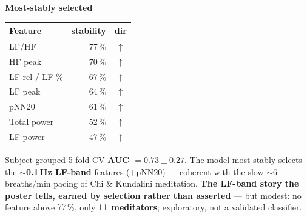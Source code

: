 \documentclass[fontsize=9pt]{scrartcl}
\renewcommand{\arraystretch}{1.35}
\newlength{\panelA}\setlength{\panelA}{97mm}
\begin{document}
\begin{minipage}[t][210mm][t]{\panelA}
\begin{tcolorbox}[panel,colback=jcindigodk,width=\panelA,height=210mm,fontupper=\color{white}]
  {\color{jclav}\bfseries\normalsize Most-stably selected\par}\vspace{2mm}
  {\color{white!92}\normalsize
   \renewcommand{\arraystretch}{1.3}\setlength{\tabcolsep}{4pt}%
   \begin{tabular}{@{}l r c@{}}
     \textbf{Feature} & \textbf{stability} & \textbf{dir}\\ \hline
     LF/HF & 77\,\% & $\uparrow$\\
     HF peak & 70\,\% & $\uparrow$\\
     LF rel / LF \% & 67\,\% & $\uparrow$\\
     LF peak & 64\,\% & $\uparrow$\\
     pNN20 & 61\,\% & $\uparrow$\\
     Total power & 52\,\% & $\uparrow$\\
     LF power & 47\,\% & $\uparrow$\\
   \end{tabular}\par}
  \vspace{4mm}
  {\raggedright\normalsize\color{white!90}
   Subject-grouped 5-fold CV \textbf{AUC $=0.73\pm0.27$}. The model most stably
   selects the \textbf{$\sim$0.1\,Hz LF-band} features ($+$pNN20) --- coherent with
   the slow $\sim$6\,breaths/min pacing of Chi \& Kundalini meditation. \textbf{The
   LF-band story the poster tells, earned by selection rather than asserted} --- but
   modest: no feature above 77\,\%, only \textbf{11 meditators}; exploratory, not a
   validated classifier.\par}
\end{tcolorbox}%
\end{minipage}%
\end{document}
